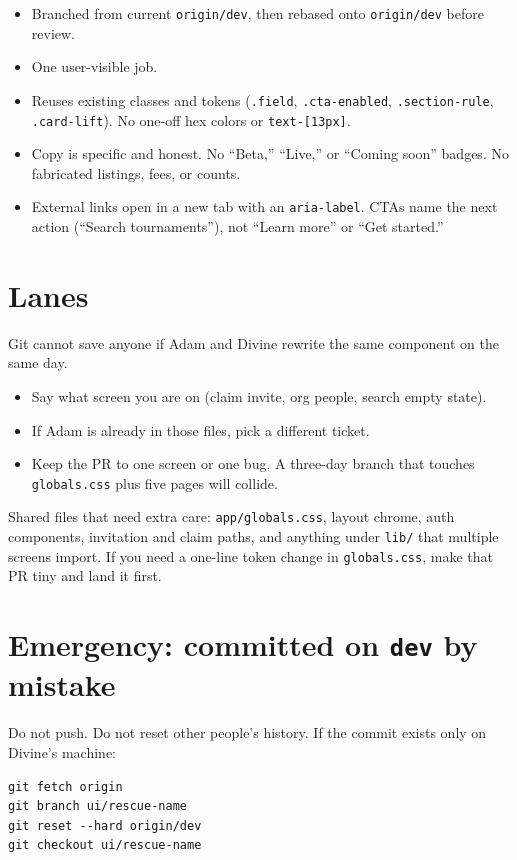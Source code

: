 \documentclass[11pt]{article}
\begin{document}
\begin{itemize}
  \item Branched from current \texttt{origin/dev}, then rebased onto \texttt{origin/dev} before review.
  \item One user-visible job.
  \item Reuses existing classes and tokens (\texttt{.field}, \texttt{.cta-enabled}, \texttt{.section-rule}, \texttt{.card-lift}). No one-off hex colors or \texttt{text-[13px]}.
  \item Copy is specific and honest. No ``Beta,'' ``Live,'' or ``Coming soon'' badges. No fabricated listings, fees, or counts.
  \item External links open in a new tab with an \texttt{aria-label}. CTAs name the next action (``Search tournaments''), not ``Learn more'' or ``Get started.''
\end{itemize}

\section{Lanes}

Git cannot save anyone if Adam and Divine rewrite the same component on the same day.

\begin{itemize}
  \item Say what screen you are on (claim invite, org people, search empty state).
  \item If Adam is already in those files, pick a different ticket.
  \item Keep the PR to one screen or one bug. A three-day branch that touches \texttt{globals.css} plus five pages will collide.
\end{itemize}

Shared files that need extra care: \texttt{app/globals.css}, layout chrome, auth components, invitation and claim paths, and anything under \texttt{lib/} that multiple screens import. If you need a one-line token change in \texttt{globals.css}, make that PR tiny and land it first.

\section{Emergency: committed on \texttt{dev} by mistake}

Do not push. Do not reset other people's history. If the commit exists only on Divine's machine:

\begin{Verbatim}[fontsize=\small,frame=single,framesep=5pt]
git fetch origin
git branch ui/rescue-name
git reset --hard origin/dev
git checkout ui/rescue-name
\end{Verbatim}
\end{document}
